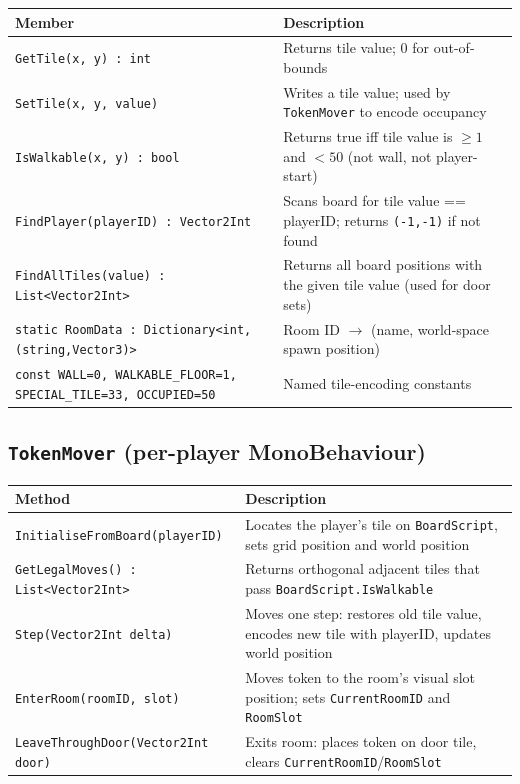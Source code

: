 \begin{table}[H]
\centering
\footnotesize
\setlength{\tabcolsep}{4pt}
\begin{tabular}{|p{4.2cm}|p{5.5cm}|}
\hline
\textbf{Member} & \textbf{Description} \\ \hline
\texttt{GetTile(x, y) : int} & Returns tile value; 0 for out-of-bounds \\ \hline
\texttt{SetTile(x, y, value)} & Writes a tile value; used by \texttt{TokenMover} to encode occupancy \\ \hline
\texttt{IsWalkable(x, y) \allowbreak : bool} & Returns true iff tile value is $\geq 1$ and $< 50$ (not wall, not player-start) \\ \hline
\texttt{FindPlayer(playerID) \allowbreak : Vector2Int} & Scans board for tile value == playerID; returns \texttt{(-1,-1)} if not found \\ \hline
\texttt{FindAllTiles(value) \allowbreak : List<Vector2Int>} & Returns all board positions with the given tile value (used for door sets) \\ \hline
\texttt{static RoomData : \allowbreak Dictionary<int,(string,\allowbreak Vector3)>} & Room ID $\to$ (name, world-space spawn position) \\ \hline
\texttt{const WALL=0, WALKABLE\-\_FLOOR=1, SPECIAL\-\_TILE=33, OCCUPIED=50} & Named tile-encoding constants \\ \hline
\end{tabular}
\end{table}

\subsection*{\texttt{TokenMover} (per-player MonoBehaviour)}

\begin{table}[H]
\centering
\footnotesize
\setlength{\tabcolsep}{4pt}
\begin{tabular}{|p{4.2cm}|p{5.5cm}|}
\hline
\textbf{Method} & \textbf{Description} \\ \hline
\texttt{InitialiseFromBoard(\allowbreak playerID)} & Locates the player's tile on \texttt{BoardScript}, sets grid position and world position \\ \hline
\texttt{GetLegalMoves() \allowbreak : List<Vector2Int>} & Returns orthogonal adjacent tiles that pass \texttt{BoardScript.IsWalkable} \\ \hline
\texttt{Step(Vector2Int delta)} & Moves one step: restores old tile value, encodes new tile with playerID, updates world position \\ \hline
\texttt{EnterRoom(\allowbreak roomID, slot)} & Moves token to the room's visual slot position; sets \texttt{CurrentRoomID} and \texttt{RoomSlot} \\ \hline
\texttt{LeaveThroughDoor(\allowbreak Vector2Int door)} & Exits room: places token on door tile, clears \texttt{CurrentRoomID}/\texttt{RoomSlot} \\ \hline
\end{tabular}
\end{table}

